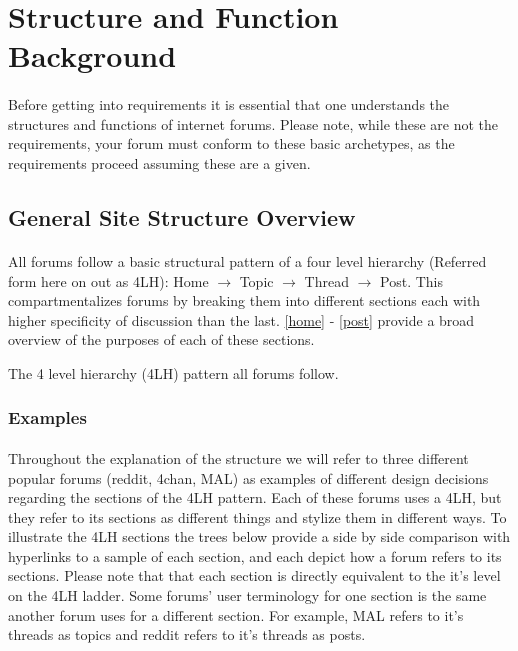 \documentclass[]{article}
\begin{document}
\section{Structure and Function Background}
\paragraph{}
Before getting into requirements it is essential that one understands the structures and functions of internet forums. Please note, while these are not the requirements, your forum must conform to these basic archetypes, as the requirements proceed assuming these are a given. 

\subsection{General Site Structure Overview}\label{structOver}
\begin{minipage}{0.65\textwidth}
\paragraph{}
All forums follow a basic structural pattern of a four level hierarchy (Referred form here on out as 4LH): Home $\to$ Topic $\to$ Thread $\to$ Post. This compartmentalizes forums by breaking them into different sections each with higher specificity of discussion than the last. \ref{home} - \ref{post} provide a broad overview of the purposes of each of these sections.
\end{minipage}%
\hspace{0.5cm}
\vline
\hspace{0.5cm}
\begin{minipage}{0.35\textwidth}
\vspace{0.5 cm}
The 4 level hierarchy (4LH) pattern all forums follow.  
\end{minipage}%

\newpage

\subsubsection{Examples}\label{StructEx}
\paragraph{}
Throughout the explanation of the structure we will refer to three different popular forums (reddit, 4chan, MAL) as examples of different design decisions regarding the sections of the 4LH pattern. Each of these forums uses a 4LH, but they refer to its sections as different things and stylize them in different ways. To illustrate the 4LH sections the trees below provide a side by side comparison with hyperlinks to a sample of each section, and each depict how a forum refers to its sections. Please note that that each section is directly equivalent to the it's level on the 4LH ladder. Some forums' user terminology for one section is the same another forum uses for a different section. For example, MAL refers to it's threads as topics and reddit refers to it's threads as posts.
\end{document}
